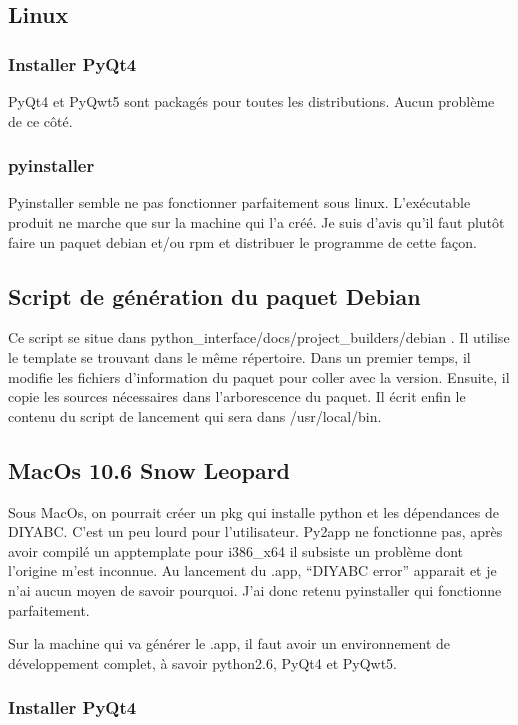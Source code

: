 \documentclass[12pt,a4paper]{article}
\begin{document}
    \subsection{Linux}
        \subsubsection{Installer PyQt4}
        PyQt4 et PyQwt5 sont packagés pour toutes les distributions. Aucun problème de ce côté.
        \subsubsection{pyinstaller}
        Pyinstaller semble ne pas fonctionner parfaitement sous linux. L'exécutable produit ne marche que
        sur la machine qui l'a créé. Je suis d'avis qu'il faut plutôt faire un paquet debian et/ou rpm
        et distribuer le programme de cette façon.
        \subsection{Script de génération du paquet Debian}
        Ce script se situe dans python\_interface/docs/project_builders/debian . Il utilise le template se trouvant dans le même
        répertoire. Dans un premier temps, il modifie les fichiers d'information du paquet pour coller avec la version. Ensuite, il 
        copie les sources nécessaires dans l'arborescence du paquet. Il écrit enfin le contenu du script de lancement qui sera dans
        /usr/local/bin.

    \subsection{MacOs 10.6 Snow Leopard}
        Sous MacOs, on pourrait cr\'eer un pkg qui installe python et les d\'ependances de DIYABC. C'est un peu lourd
        pour l'utilisateur. Py2app ne fonctionne pas, après avoir compil\'e un apptemplate pour i386\_x64
        il subsiste un problème dont l'origine m'est inconnue. Au lancement
        du .app, ``DIYABC error'' apparait et je n'ai aucun moyen de savoir pourquoi. J'ai donc retenu pyinstaller qui fonctionne parfaitement.

        Sur la machine qui va g\'en\'erer le .app, il faut avoir un environnement de d\'eveloppement complet, à savoir
        python2.6, PyQt4 et PyQwt5.

        \subsubsection{Installer PyQt4}
\end{document}
